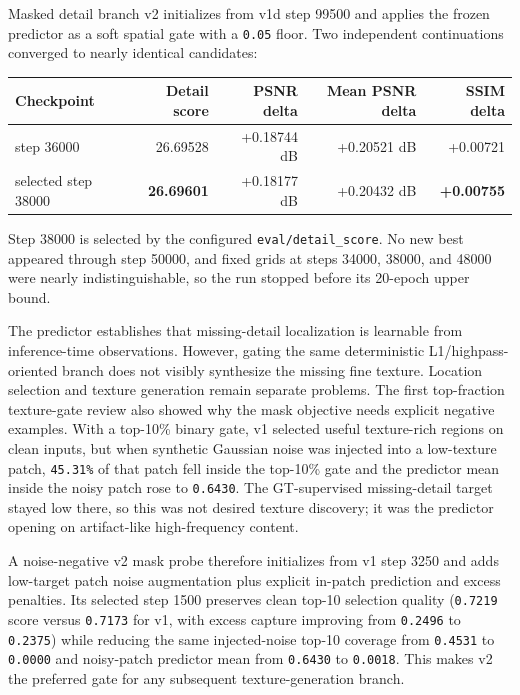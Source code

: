 \documentclass[
  10pt,
]{article}
\begin{document}
Masked detail branch v2 initializes from v1d step 99500 and applies the
frozen predictor as a soft spatial gate with a \texttt{0.05} floor. Two
independent continuations converged to nearly identical candidates:

\begin{longtable}[]{@{}lrrrr@{}}
\toprule\noalign{}
Checkpoint & Detail score & PSNR delta & Mean PSNR delta & SSIM delta \\
\midrule\noalign{}
\endhead
\bottomrule\noalign{}
\endlastfoot
step 36000 & 26.69528 & +0.18744 dB & +0.20521 dB & +0.00721 \\
selected step 38000 & \textbf{26.69601} & +0.18177 dB & +0.20432 dB &
\textbf{+0.00755} \\
\end{longtable}

Step 38000 is selected by the configured \texttt{eval/detail\_score}. No
new best appeared through step 50000, and fixed grids at steps 34000,
38000, and 48000 were nearly indistinguishable, so the run stopped
before its 20-epoch upper bound.

The predictor establishes that missing-detail localization is learnable
from inference-time observations. However, gating the same deterministic
L1/highpass-oriented branch does not visibly synthesize the missing fine
texture. Location selection and texture generation remain separate
problems. The first top-fraction texture-gate review also showed why the
mask objective needs explicit negative examples. With a top-10\% binary
gate, v1 selected useful texture-rich regions on clean inputs, but when
synthetic Gaussian noise was injected into a low-texture patch,
\texttt{45.31\%} of that patch fell inside the top-10\% gate and the
predictor mean inside the noisy patch rose to \texttt{0.6430}. The
GT-supervised missing-detail target stayed low there, so this was not
desired texture discovery; it was the predictor opening on artifact-like
high-frequency content.

A noise-negative v2 mask probe therefore initializes from v1 step 3250
and adds low-target patch noise augmentation plus explicit in-patch
prediction and excess penalties. Its selected step 1500 preserves clean
top-10 selection quality (\texttt{0.7219} score versus \texttt{0.7173}
for v1, with excess capture improving from \texttt{0.2496} to
\texttt{0.2375}) while reducing the same injected-noise top-10 coverage
from \texttt{0.4531} to \texttt{0.0000} and noisy-patch predictor mean
from \texttt{0.6430} to \texttt{0.0018}. This makes v2 the preferred
gate for any subsequent texture-generation branch.
\end{document}
